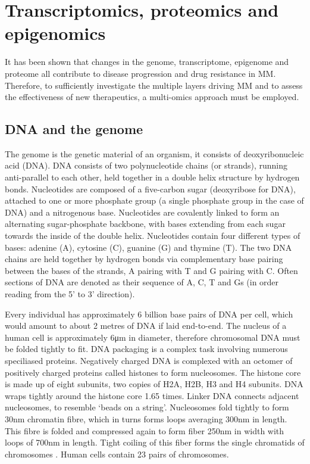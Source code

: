 %
\afterpage{\clearpage} %
%
\section{Transcriptomics, proteomics and epigenomics}
It has been shown that changes in the genome, transcriptome, epigenome and proteome all contribute to disease progression and drug resistance in MM.
Therefore, to sufficiently investigate the multiple layers driving MM and to assess the effectiveness of new therapeutics, a multi-omics approach must be employed.

\subsection{DNA and the genome}\label{subsec:dna}
The genome is the genetic material of an organism, it consists of deoxyribonucleic acid (DNA).
DNA consists of two polynucleotide chains (or strands), running anti-parallel to each other, held together in a double helix structure by hydrogen bonds.
Nucleotides are composed of a five-carbon sugar (deoxyribose for DNA), attached to one or more phosphate group (a single phosphate group in the case of DNA) and a nitrogenous base.
Nucleotides are covalently linked to form an alternating sugar-phosphate backbone, with bases extending from each sugar towards the inside of the double helix.
Nucleotides contain four different types of bases: adenine (A), cytosine (C), guanine (G) and thymine (T).
The two DNA chains are held together by hydrogen bonds via complementary base pairing between the bases of the strands, A pairing with T and G pairing with C\@.
Often sections of DNA are denoted as their sequence of A, C, T and Gs (in order reading from the 5' to 3' direction).

Every individual has approximately 6 billion base pairs of DNA per cell, which would amount to about 2 metres of DNA if laid end-to-end.
The nucleus of a human cell is approximately 6\si{\micro\meter} in diameter, therefore chromosomal DNA must be folded tightly to fit.
DNA packaging is a complex task involving numerous speciliased proteins.
Negatively charged DNA is complexed with an octomer of positively charged proteins called histones to form nucleosomes.
The histone core is made up of eight subunits, two copies of H2A, H2B, H3 and H4 subunits.
DNA wraps tightly around the histone core 1.65 times.
Linker DNA connects adjacent nucleosomes, to resemble `beads on a string'.
Nucleosomes fold tightly to form 30\si{\nm} chromatin fibre, which in turns forms loops averaging 300\si{\nm} in length.
This fibre is folded and compressed again to form fiber 250\si{\nm} in width with loops of 700\si{\nm} in length.
Tight coiling of this fiber forms the single chromatids of chromosomes \cite{annunziato2008dna, alberts2002chromosomal}.
Human cells contain 23 pairs of chromosomes.

